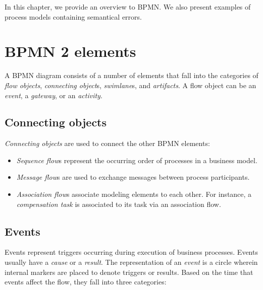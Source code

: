 In this chapter, we provide an overview to BPMN. We also present examples of process models containing semantical errors.

\section{BPMN 2 elements}
A BPMN diagram consists of a number of elements that fall into the categories of \emph{flow objects}, \emph{connecting object}s, \emph{swimlane}s, and \emph{artifacts}. A flow object can be
an \emph{event}, a \emph{gateway}, or an \emph{activity}. 

\subsection{Connecting objects}
\emph{Connecting objects} are used to connect the other BPMN elements: 
\begin{itemize}
\item \emph{Sequence flow}s represent the occurring order of processes in a business model. 
\item \emph{Message flow}s are used to exchange messages between process participants. 
\item \emph{Association flow}s associate modeling elements to each other. For instance, a \emph{compensation task} is associated to its task via an association flow.
\end{itemize}

%
%

\subsection{Events} 
Events represent triggers occurring during execution of business processes. Events usually have a \emph{cause} or a \emph{result}. The representation of an \emph{event} is a circle wherein internal markers are placed to denote triggers or results. 
Based on the time that events affect the flow, they fall into three categories: %
%
%

